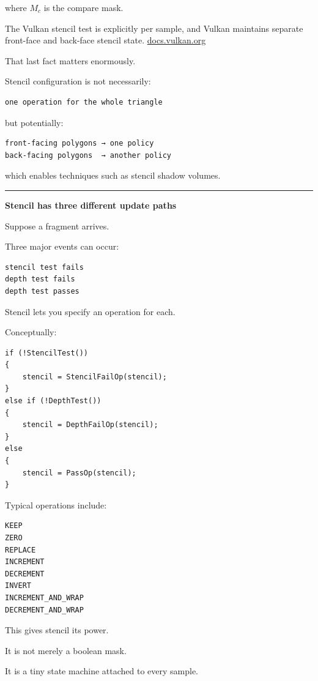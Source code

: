 where \(M_c\) is the compare mask.

The Vulkan stencil test is explicitly per sample, and Vulkan maintains separate front-face and back-face stencil state. \href{https://docs.vulkan.org/spec/latest/chapters/fragops.html?utm_source=chatgpt.com}{docs.vulkan.org}

That last fact matters enormously.

Stencil configuration is not necessarily:

\begin{verbatim}
one operation for the whole triangle
\end{verbatim}

but potentially:

\begin{verbatim}
front-facing polygons → one policy
back-facing polygons  → another policy
\end{verbatim}

which enables techniques such as stencil shadow volumes.

\begin{center}\rule{0.5\linewidth}{0.5pt}\end{center}

\textbf{Stencil has three different update paths}

Suppose a fragment arrives.

Three major events can occur:

\begin{verbatim}
stencil test fails
depth test fails
depth test passes
\end{verbatim}

Stencil lets you specify an operation for each.

Conceptually:

\begin{verbatim}
if (!StencilTest())
{
    stencil = StencilFailOp(stencil);
}
else if (!DepthTest())
{
    stencil = DepthFailOp(stencil);
}
else
{
    stencil = PassOp(stencil);
}
\end{verbatim}

Typical operations include:

\begin{verbatim}
KEEP
ZERO
REPLACE
INCREMENT
DECREMENT
INVERT
INCREMENT_AND_WRAP
DECREMENT_AND_WRAP
\end{verbatim}

This gives stencil its power.

It is not merely a boolean mask.

It is a tiny state machine attached to every sample.

